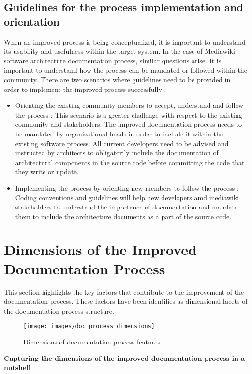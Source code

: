 \subsection{Guidelines for the process implementation and orientation}
When an improved process is being conceptualized, it is important to understand its usability and usefulness within the target system. In the case of Mediawiki software architecture documentation process, similar questions arise. It is important to understand how the process can be mandated or followed within the community.
\indent There are two scenarios where guidelines need to be provided in order to implement the improved process successfully \cite{Employee} :
\begin{itemize}
\item Orienting the existing community members to accept, understand and follow the process : 
\newline This scenario is a greater challenge with respect to the existing community and stakeholders. The improved documentation process needs to be mandated by organizational heads in order to include it within the existing software process. All current developers need to be advised and instructed by architects to obligatorily include the documentation of architectural components in the source code before committing the code that they write or update. 
\item Implementing the process by orienting new members to follow the process :
\newline Coding conventions and guidelines will help new developers amd mediawiki stakeholders to understand the importance of documentation and mandate them to include the architecture documents as a part of the source code.
\end{itemize}





\section{Dimensions of the Improved Documentation Process} \label{PorcDimension}
\indent This section highlights the key factors that contribute to the improvement of the documentation process. These factors have been identifies as dimensional facets of the documentation process structure. 
\begin{figure}[H]
  \centering
  \texttt{[image: images/doc\_process\_dimensions]}
  \caption[Dimensions of documentation process features]{Dimensions of documentation process features.}\label{fig:doc_process_dimensions}
\end{figure}
\textbf{Capturing the dimensions of the improved documentation process in a nutshell} 


